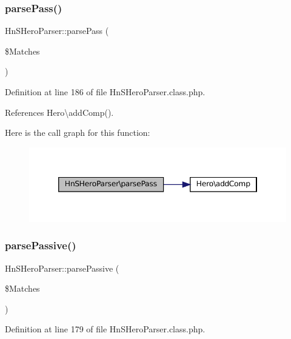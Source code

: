 \subsubsection{\texorpdfstring{parse\+Pass()}{parsePass()}}
{\footnotesize\ttfamily Hn\+S\+Hero\+Parser\+::parse\+Pass (\begin{DoxyParamCaption}\item[{}]{\$\+Matches }\end{DoxyParamCaption})\hspace{0.3cm}{\ttfamily [protected]}}



Definition at line 186 of file Hn\+S\+Hero\+Parser.\+class.\+php.



References Hero\textbackslash{}add\+Comp().

Here is the call graph for this function\+:\nopagebreak
\begin{figure}[H]
\begin{center}
\leavevmode
\includegraphics[width=346pt]{class_hn_s_hero_parser_acef885d138ef4a0ad902150d968b60ef_cgraph}
\end{center}
\end{figure}
\mbox{\label{class_hn_s_hero_parser_adef3a079ee7bfd550c80bac1a6148eb0}} 
\subsubsection{\texorpdfstring{parse\+Passive()}{parsePassive()}}
{\footnotesize\ttfamily Hn\+S\+Hero\+Parser\+::parse\+Passive (\begin{DoxyParamCaption}\item[{}]{\$\+Matches }\end{DoxyParamCaption})\hspace{0.3cm}{\ttfamily [protected]}}



Definition at line 179 of file Hn\+S\+Hero\+Parser.\+class.\+php.

